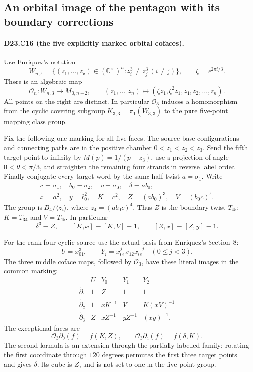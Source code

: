 \subsection{An orbital image of the pentagon with its boundary corrections}

\paragraph{D23.C16 (the five explicitly marked orbital cofaces).}
Use Enriquez's notation
\[
 W_{n,3}=\{(z_1,\ldots,z_n)\in(\mathbb C^\times)^n:
                     z_i^3\ne z_j^3\ (i\ne j)\},
 \qquad \zeta=e^{2\pi i/3}.
\]
There is an algebraic map
\[
 \mathcal O_n:W_{n,3}\longrightarrow M_{0,n+2},\qquad
 (z_1,\ldots,z_n)\longmapsto
       (\zeta z_1,\zeta^2z_1,z_1,z_2,\ldots,z_n).
\tag{D23.C16.1}
\]
All points on the right are distinct. In particular $\mathcal O_3$
induces a homomorphism from the cyclic covering subgroup
$K_{3,3}=\pi_1(W_{3,3})$ to the pure five-point mapping class group.

Fix the following one marking for all five faces. The source base
configurations and connecting paths are in the positive chamber
$0<z_1<z_2<z_3$. Send the fifth target point to infinity by
$M(p)=1/(p-z_3)$, use a projection of angle
$0<\theta<\pi/3$, and straighten the remaining four strands in
reverse label order. Finally conjugate every target word by the
same half twist $a=\sigma_1$. Write
\[
 \begin{gathered}
 a=\sigma_1,\quad b_0=\sigma_2,\quad c=\sigma_3,
 \quad\delta=ab_0,\\
 x=a^2,\quad y=b_0^2,\quad K=c^2,\quad
 Z=(ab_0)^3,\quad V=(b_0c)^3.
 \end{gathered}
\tag{D23.C16.2}
\]
The group is $B_4/\langle z_4\rangle$, where
$z_4=(ab_0c)^4$. Thus $Z$ is the boundary twist $T_{45}$;
$K=T_{34}$ and $V=T_{15}$. In particular
\[
 \delta^3=Z,\qquad [K,x]=[K,V]=1,
       \qquad [Z,x]=[Z,y]=1.
\tag{D23.C16.3}
\]

For the rank-four cyclic source use the actual basis from
Enriquez's Section~8:
\[
 U=x_{01}^3,\qquad Y_j=x_{01}^j x_{12}x_{01}^{-j}\quad(0\le j<3).
\]
The three middle coface maps, followed by $\mathcal O_3$, have
these literal images in the common marking:
\[
\begin{array}{c|cccc}
 &U&Y_0&Y_1&Y_2\\\hline
\widetilde\partial_1&1&Z&1&1\\
\widetilde\partial_2&1&xK^{-1}&V&K(xV)^{-1}\\
\widetilde\partial_3&Z&xZ^{-1}&yZ^{-1}&(xy)^{-1}.
\end{array}
\tag{D23.C16.4}
\]
The exceptional faces are
\[
 \mathcal O_3\partial_0(f)=f(K,Z),\qquad
 \mathcal O_3\partial_4(f)=f(\delta,K).
\tag{D23.C16.5}
\]
The second formula is an extension through the partially labelled
family: rotating the first coordinate through $120$ degrees
permutes the first three target points and gives $\delta$.
Its cube is $Z$, and is not set to one in the five-point group.

